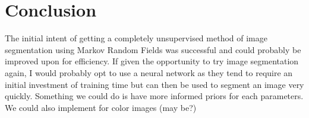 \documentclass[11pt]{article}
\begin{document}
\section{Conclusion}
The initial intent of getting a completely unsupervised method of image segmentation using Markov Random Fields was successful and could probably be improved upon for efficiency. If given the opportunity to try image segmentation again, I would probably opt to use a neural network as they tend to require an initial investment of training time but can then be used to segment an image very quickly. Something we could do is have more informed priors for each parameters. We could also implement for color images (may be?)
\end{document}

